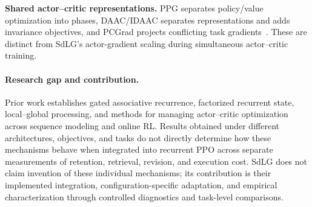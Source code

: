 \par\vspace{0.45\baselineskip}\noindent\textbf{Shared actor--critic representations.}
PPG separates policy/value optimization into phases, DAAC/IDAAC separates representations and adds invariance objectives, and PCGrad projects conflicting task gradients~\cite{cobbe2021phasic,raileanu2021decoupling,yu2020gradient}. These are distinct from SdLG's actor-gradient scaling during simultaneous actor--critic training.

\paragraph{Research gap and contribution.}
Prior work establishes gated associative recurrence, factorized recurrent state, local--global processing, and methods for managing actor--critic optimization across sequence modeling and online RL. Results obtained under different architectures, objectives, and tasks do not directly determine how these mechanisms behave when integrated into recurrent PPO across separate measurements of retention, retrieval, revision, and execution cost. SdLG does not claim invention of these individual mechanisms; its contribution is their implemented integration, configuration-specific adaptation, and empirical characterization through controlled diagnostics and task-level comparisons.
